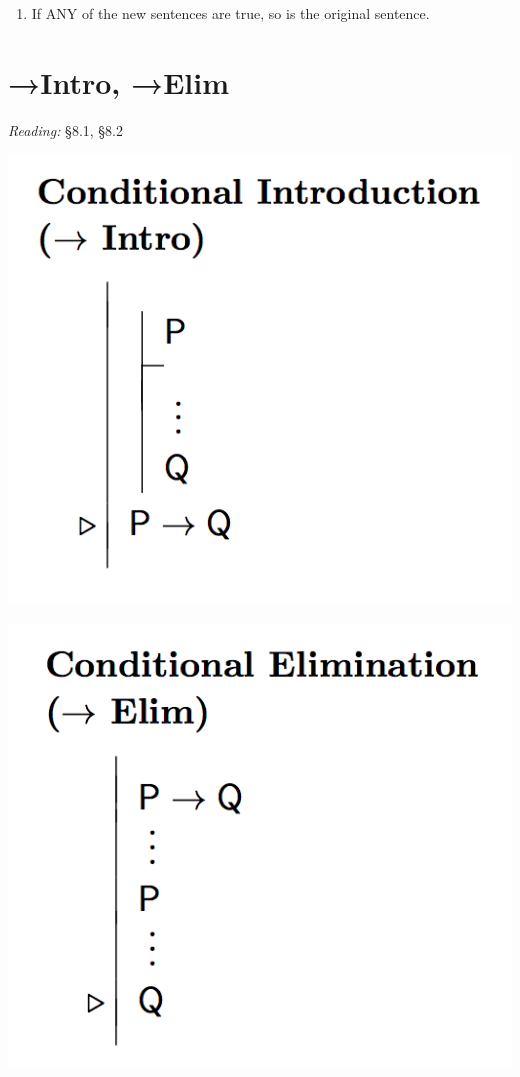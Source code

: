 \documentclass[12pt]{extarticle}
\begin{document}
\begin{multicols*}{3}
\begin{enumerate}
\item If ANY of the new sentences are true, so is the original sentence.
 
\end{enumerate}
 
 
 
\section{→Intro, →Elim}
 
\emph{Reading:} §8.1, §8.2
 
\begin{center}
\includegraphics[scale=0.3]{img/rule_arrow_intro.png}
\end{center}
\begin{center}
\includegraphics[scale=0.3]{img/rule_arrow_elim.png}
\end{center}
 

\end{multicols*}
\end{document}
